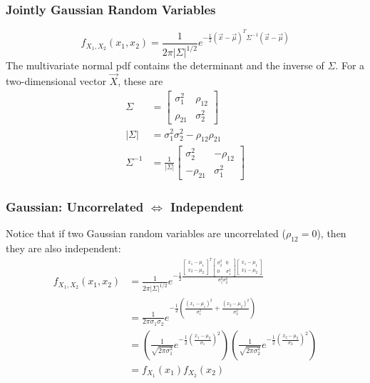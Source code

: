 \documentclass{beamer}
\begin{document}
\begin{frame}
  \frametitle{Jointly Gaussian Random Variables}
  \[
  f_{X_1,X_2}(x_1,x_2) = \frac{1}{2\pi|\Sigma|^{1/2}}
  e^{-\frac{1}{2}(\vec{x}-\vec\mu)^T\Sigma^{-1}(\vec{x}-\vec\mu)}
  \]
  The multivariate normal pdf contains the determinant and the inverse of $\Sigma$.
  For a two-dimensional vector $\vec{X}$, these are
  \begin{align*}
    \Sigma &= \left[\begin{array}{cc}\sigma_1^2 & \rho_{12} \\\rho_{21} & \sigma_2^2\end{array}\right]\\
    |\Sigma| &=\sigma_1^2\sigma_2^2 - \rho_{12}\rho_{21}\\
    \Sigma^{-1} &= \frac{1}{|\Sigma|}\left[\begin{array}{cc}
        \sigma_2^2 & -\rho_{12}\\-\rho_{21} & \sigma_1^2\end{array}\right]
  \end{align*}
\end{frame}  
  
\begin{frame}
  \frametitle{Gaussian: Uncorrelated $\Leftrightarrow$ Independent}

  Notice that if two Gaussian random variables are uncorrelated
  ($\rho_{12}=0$), then they are also independent:
  \begin{align*}
    f_{X_1,X_2}(x_1,x_2)
    &=\frac{1}{2\pi|\Sigma|^{1/2}}
    e^{-\frac{1}{2}
      \frac{\left[\begin{array}{c}x_1-\mu_1\\x_2-\mu_2\end{array}\right]^T
        \left[\begin{array}{cc}\sigma_2^2&0\\0&\sigma_1^2\end{array}\right]
        \left[\begin{array}{c}x_1-\mu_1\\x_2-\mu_2\end{array}\right]}
      {\sigma_1^2\sigma_2^2}}\\
    &=\frac{1}{2\pi\sigma_1\sigma_2}
    e^{-\frac{1}{2}\left(\frac{(x_1-\mu_1)^2}{\sigma_1^2}+\frac{(x_2-\mu_2)^2}{\sigma_2^2}\right)}\\
    &=\left(\frac{1}{\sqrt{2\pi\sigma_1^2}}e^{-\frac{1}{2}\left(\frac{x_1-\mu_2}{\sigma_1}\right)^2}\right)
    \left(\frac{1}{\sqrt{2\pi\sigma_2^2}}e^{-\frac{1}{2}\left(\frac{x_2-\mu_2}{\sigma_2}\right)^2}\right)
    \\
    &=f_{X_1}(x_1)f_{X_2}(x_2)
  \end{align*}
\end{frame}  
  
\end{document}
